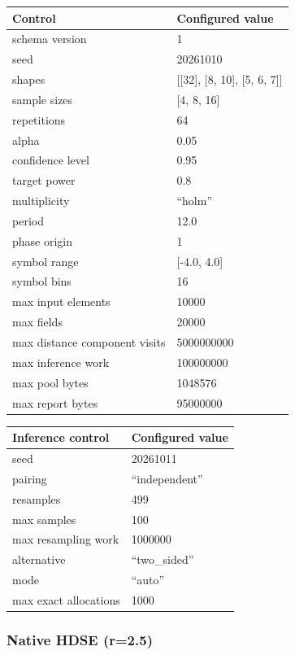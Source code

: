 \documentclass[
  english,
  11pt,
]{article}
\newcounter{none} %
\begin{document}
{\def\LTcaptype{none} %
\begin{longtable}[]{@{}ll@{}}
\toprule\noalign{}
Control & Configured value \\
\midrule\noalign{}
\endhead
\bottomrule\noalign{}
\endlastfoot
schema version & 1 \\
seed & 20261010 \\
shapes & {[}{[}32{]}, {[}8, 10{]}, {[}5, 6, 7{]}{]} \\
sample sizes & {[}4, 8, 16{]} \\
repetitions & 64 \\
alpha & 0.05 \\
confidence level & 0.95 \\
target power & 0.8 \\
multiplicity & ``holm'' \\
period & 12.0 \\
phase origin & 1 \\
symbol range & {[}-4.0, 4.0{]} \\
symbol bins & 16 \\
max input elements & 10000 \\
max fields & 20000 \\
max distance component visits & 5000000000 \\
max inference work & 100000000 \\
max pool bytes & 1048576 \\
max report bytes & 95000000 \\
\end{longtable}
}

{\def\LTcaptype{none} %
\begin{longtable}[]{@{}ll@{}}
\toprule\noalign{}
Inference control & Configured value \\
\midrule\noalign{}
\endhead
\bottomrule\noalign{}
\endlastfoot
seed & 20261011 \\
pairing & ``independent'' \\
resamples & 499 \\
max samples & 100 \\
max resampling work & 1000000 \\
alternative & ``two\_sided'' \\
mode & ``auto'' \\
max exact allocations & 1000 \\
\end{longtable}
}

\subsubsection{Native HDSE (r=2.5)}\label{native-hdse-r2.5}
\end{document}

